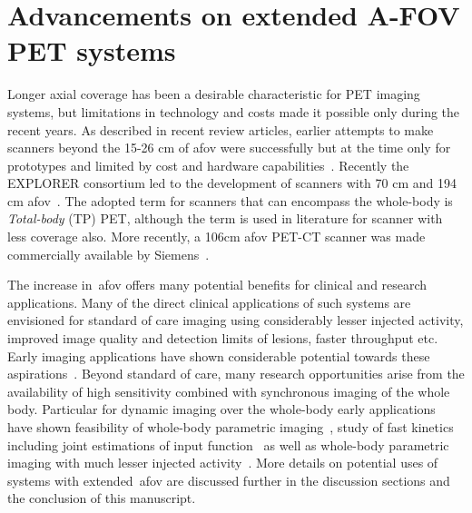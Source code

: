 \section{Advancements on extended A-FOV PET systems}
Longer axial coverage has been a desirable characteristic for PET imaging systems, but limitations in technology and costs made it possible only during the recent years. 
As described in recent review articles, earlier attempts to make scanners beyond the 15-26 cm of \gls{afov} were successfully but at the time only for prototypes and limited by cost and hardware capabilities~\cite{Vandenberghe2020,Surti2020}.
Recently the EXPLORER consortium led to the development of scanners with 70 cm and 194 cm \gls{afov}~\cite{Karp2020,Cherry2017}. The adopted term for scanners that can encompass the whole-body is \textit{Total-body} (TP) PET, although the term is used in literature for scanner with less coverage also. More recently, a 106cm \gls{afov} PET-CT scanner was made commercially available by Siemens~\cite{Siegel2020}. 

The increase in~\gls{afov} offers many potential benefits for clinical and research applications. 
Many of the direct clinical applications of such systems are envisioned for standard of care imaging using considerably lesser injected activity, improved image quality and detection limits of lesions, faster throughput etc. Early imaging applications have shown considerable potential towards these aspirations~\cite{Badawi2019,Pantel2020}.
Beyond standard of care, many research opportunities arise from the availability of high sensitivity combined with synchronous imaging of the whole body. 
Particular for dynamic imaging over the whole-body early applications have shown feasibility of whole-body parametric imaging~\cite{Zhang2020a,Zhang2020b,Wang208}, study of fast kinetics including joint estimations of input function~\cite{Feng2019,Feng2021} as well as whole-body parametric imaging with much lesser injected activity~\cite{Liu2021}.
More details on potential uses of systems with extended~\gls{afov} are discussed further in the discussion sections and the conclusion of this manuscript.
